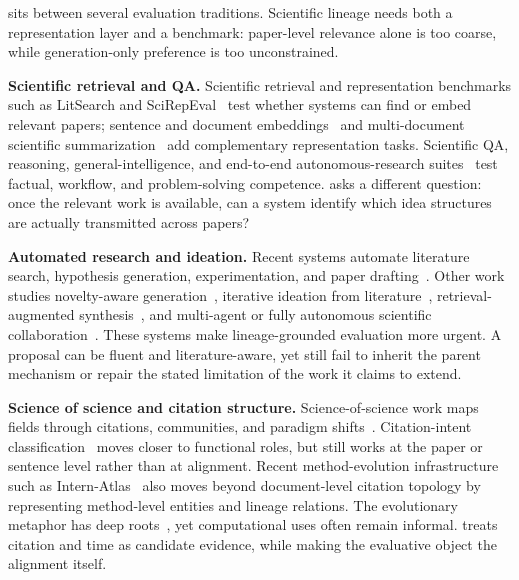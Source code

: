 \gene{} sits between several evaluation traditions. Scientific lineage needs both a representation layer and a benchmark: paper-level relevance alone is too coarse, while generation-only preference is too unconstrained.

\textbf{Scientific retrieval and QA.}
Scientific retrieval and representation benchmarks such as LitSearch and SciRepEval~\citep{litsearch,scirepeval} test whether systems can find or embed relevant papers; sentence and document embeddings~\citep{reimers2019sentence,wang2022e5} and multi-document scientific summarization~\citep{lu2020survey} add complementary representation tasks. Scientific QA, reasoning, general-intelligence, and end-to-end autonomous-research suites~\citep{scieval,sgibench,scievalkit,researchclawbench,sciq,arb} test factual, workflow, and problem-solving competence. \gene{} asks a different question: once the relevant work is available, can a system identify which idea structures are actually transmitted across papers?

\textbf{Automated research and ideation.}
Recent systems automate literature search, hypothesis generation, experimentation, and paper drafting~\citep{aiscientist,aiscientistv2,airesearcher,agentlab,coiagent}. Other work studies novelty-aware generation~\citep{scimon,nova,deepideation}, iterative ideation from literature~\citep{researchagent,si2024}, retrieval-augmented synthesis~\citep{openscholar,storm}, and multi-agent or fully autonomous scientific collaboration~\citep{sciagents,autoresearchclaw}. These systems make lineage-grounded evaluation more urgent. A proposal can be fluent and literature-aware, yet still fail to inherit the parent mechanism or repair the stated limitation of the work it claims to extend.

\textbf{Science of science and citation structure.}
Science-of-science work maps fields through citations, communities, and paradigm shifts~\citep{fortunato2018science,jurgens2018,kuhn1962}. Citation-intent classification~\citep{cohan2019} moves closer to functional roles, but still works at the paper or sentence level rather than at \genome{} alignment. Recent method-evolution infrastructure such as Intern-Atlas~\citep{internatlas} also moves beyond document-level citation topology by representing method-level entities and lineage relations. The evolutionary metaphor has deep roots~\citep{darwin1859}, yet computational uses often remain informal. \gene{} treats citation and time as candidate evidence, while making the evaluative object the \genomediff{} alignment itself.

